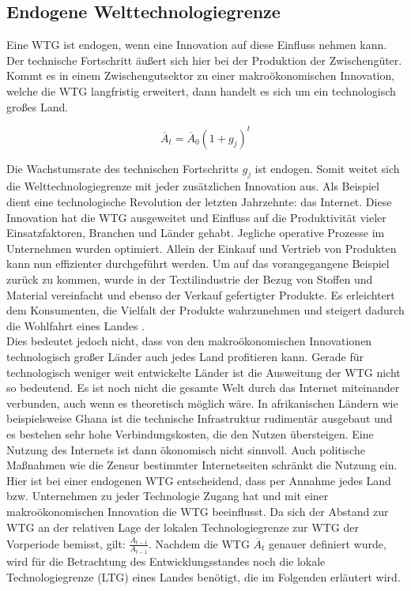 \subsection{Endogene Welttechnologiegrenze} \label{sec:endogene WTG}
Eine WTG ist endogen, wenn eine Innovation auf diese Einfluss nehmen kann. Der technische Fortschritt äußert sich hier bei der Produktion der Zwischengüter. Kommt es in einem Zwischengutsektor zu einer makroökonomischen Innovation, welche die WTG langfristig erweitert, dann handelt es sich um ein technologisch großes Land.

\begin{equation}
\overline{A}_t=\overline{A}_0(1+g_j)^t
\end{equation}

Die Wachstumsrate des technischen Fortschritts $g_j$ ist endogen. Somit weitet sich die Welttechnologiegrenze mit jeder zusätzlichen Innovation aus. Als Beispiel dient eine technologische Revolution der letzten Jahrzehnte: das Internet. Diese Innovation hat die WTG ausgeweitet und Einfluss auf die Produktivität vieler Einsatzfaktoren, Branchen und Länder gehabt. Jegliche operative Prozesse im Unternehmen wurden optimiert. Allein der Einkauf und Vertrieb von Produkten kann nun effizienter durchgeführt werden. Um auf das vorangegangene Beispiel zurück zu kommen, wurde in der Textilindustrie der Bezug von Stoffen und Material vereinfacht und ebenso der Verkauf gefertigter Produkte. Es erleichtert dem Konsumenten, die Vielfalt der Produkte wahrzunehmen und steigert dadurch  die Wohlfahrt eines Landes \cite{Krugman.79}.\\
%
Dies bedeutet jedoch nicht, dass von den makroökonomischen Innovationen technologisch großer Länder auch jedes Land profitieren kann. Gerade für technologisch weniger weit entwickelte Länder ist die Ausweitung der WTG nicht so bedeutend. Es ist noch nicht die gesamte Welt durch das Internet miteinander verbunden, auch wenn es theoretisch möglich wäre. In afrikanischen Ländern wie beispielsweise Ghana ist die technische Infrastruktur rudimentär ausgebaut und es bestehen sehr hohe Verbindungskosten, die den Nutzen übersteigen. Eine Nutzung des Internets ist dann ökonomisch nicht sinnvoll. Auch politische Maßnahmen wie die Zensur bestimmter Internetseiten schränkt die Nutzung ein.\\
%
Hier ist bei einer endogenen WTG entscheidend, dass per Annahme jedes Land bzw. Unternehmen zu jeder Technologie Zugang hat und mit einer makroökonomischen Innovation die WTG beeinflusst.
%
\bigskip
Da sich der Abstand zur WTG an der relativen Lage der lokalen Technologiegrenze zur WTG der Vorperiode bemisst, gilt: $\frac{\overline{A}_{t-1}}{A_{t-1}}$. Nachdem die WTG $\overline{A}_{t}$ genauer definiert wurde, wird für die Betrachtung des Entwicklungsstandes noch die lokale Technologiegrenze (LTG) eines Landes benötigt, die im Folgenden erläutert wird.
%
